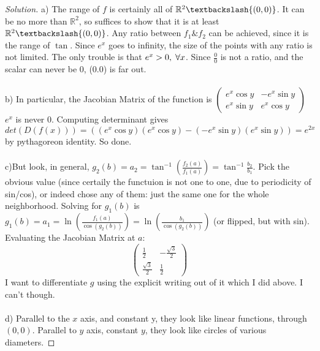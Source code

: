 \documentclass{article}
\newcommand{\R}{\mathbb{R}}
\newenvironment{solution}{\begin{proof}[Solution]}{\end{proof}}
\begin{document}
\begin{solution}
    a) The range of $f$ is certainly all of $\R^{2}\textbackslash{(0,0)}$. It can be no more than $\R^2$, so suffices to show that it is at least $\R^2\textbackslash{(0,0)}$. Any ratio between $f_{1} \& f_{2}$ can be achieved, since it is the range of $\tan$. Since $e^x$ goes to infinity, the size of the points with any ratio is not limited. The only trouble is that $e^{x}>0, \hspace{1mm} \forall x$. Since $\frac{0}{0}$ is not a ratio, and the scalar can never be 0, (0.0) is far out. 
    \\\\
    b) In particular, the Jacobian Matrix of the function is \begin{math}
        \begin{pmatrix}
            e^{x}\cos y & -e^{x}\sin y \\
            e^{x}\sin y & e^{x}\cos y 
        \end{pmatrix}
    \end{math}
    \\
    $e^x$ is never $0$. Computing determinant gives $det(D(f(x))) = ((e^{x}\cos y)(e^{x}\cos y)-(-e^{x}\sin y)(e^{x}\sin y))= e^{2x}$ by pythagoreon identity.  So done.
    \\\\
    c)But look, in general, $g_{2}(b) = a_{2} = \tan^{-1} (\frac{f_{2}(a)}{f_{1}(a)}) = \tan^{-1}\frac{b_{2}}{b_{1}}$. Pick the obvious value (since certaily the functuion is not one to one, due to periodicity of sin/cos), or indeed chose any of them: just the same one for the whole neighborhood. Solving for $g_{1}(b)$ is $g_{1}(b) = a_{1} = \ln (\frac{f_{1}(a)}{\cos (g_{2}(b))}) = \ln (\frac{b_{1}}{\cos(g_{2}(b))})$ (or flipped, but with sin). 
    \\
    Evaluating the Jacobian Matrix at $a$: 
    \[
    \begin{pmatrix}
        \frac{1}{2} &-\frac{\sqrt{3}}{2} \\
        \frac{\sqrt{3}}{2} & \frac{1}{2}
    \end{pmatrix}
    \]
    I want to differentiate $g$ using the explicit writing out of it which I did above. I can't though.
    \\ \\
    d) Parallel to the $x$ axis, and constant y, they look like linear functions, through $(0,0)$. Parallel to $y$ axis, constant $y$, they look like circles of various diameters.
    
\end{solution}
\end{document}
